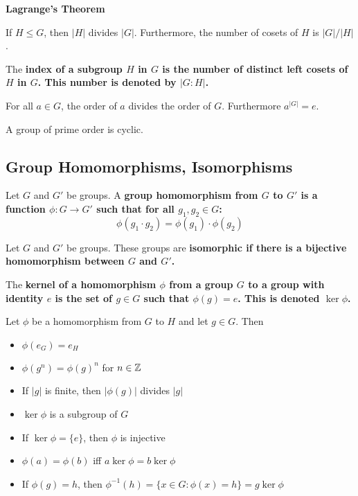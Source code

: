 \documentclass{hmwk}
\begin{document}
\begin{important}
\bf{Lagrange's Theorem}

If $H \leq G$, then $|H|$ divides $|G|$. Furthermore, the number of cosets of $H$ is $|G|/|H|$.
\end{important}

\begin{defn}
The \bf{index} of a subgroup $H$ in $G$ is the number of distinct left cosets of $H$ in $G$. This number is denoted by $|G:H|$.
\end{defn}

\begin{prop}
For all $a \in G$, the order of $a$ divides the order of $G$. Furthermore $a^{|G|} = e$.
\end{prop}

\begin{prop}
A group of prime order is cyclic. 
\end{prop}

\subsection{Group Homomorphisms, Isomorphisms}

\begin{defn}
Let $G$ and $G'$ be groups. A \bf{group homomorphism} from $G$ to $G'$ is a function $\phi: G \rightarrow G'$ such that for all $g_1, g_2 \in G$:
$$\phi(g_1\cdot g_2) = \phi(g_1) \cdot \phi(g_2)$$
\end{defn}

\begin{defn}
Let $G$ and $G'$ be groups. These groups are \bf{isomorphic} if there is a bijective homomorphism between $G$ and $G'$.
\end{defn}

\begin{defn}
The \bf{kernel} of a homomorphism $\phi$ from a group $G$ to a group with identity $e$ is the set of $g \in G$ such that $\phi(g) = e$. This is denoted $\ker \phi$.
\end{defn}

\begin{prop}
Let $\phi$ be a homomorphism from $G$ to $H$ and let $g \in G$. Then
\begin{itemize}
    \item $\phi(e_G) = e_H$
    \item $\phi(g^n) = \phi(g)^n$ for $n \in \mathbb{Z}$
    \item If $|g|$ is finite, then $|\phi(g)|$ divides $|g|$
    \item $\ker \phi$ is a subgroup of $G$
    \item If $\ker\phi = \{e\}$, then $\phi$ is injective
    \item $\phi(a) = \phi(b)$ iff $a \ker \phi = b \ker \phi$
    \item If $\phi(g) = h$, then $\phi^{-1}(h) = \{x \in G : \phi(x) = h\} = g \ker \phi$
\end{itemize}
\end{prop}
\end{document}
